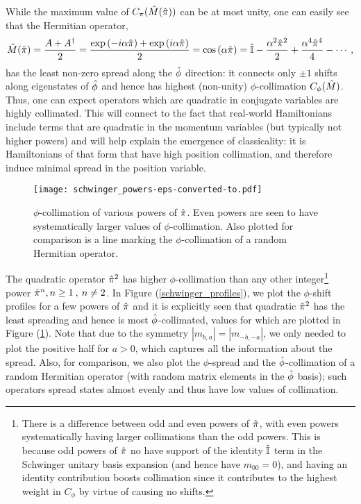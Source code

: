\documentclass[aps,pra,onecolumn,nofootinbib,12pt,tightenlines]{revtex4-1}
\begin{document}
While the maximum value of $C_{\pi}(\hat{M}(\hat{\pi}))$ can be at most unity, one can easily see that the Hermitian operator,
\begin{equation}
\M(\oppi) = \frac{A + A^{\dag}}{2} = \frac{\exp{\left(- i \alpha \oppi\right)} + \exp{\left(i \alpha \oppi\right)}}{2} = \cos\left( \alpha \oppi \right) = \eye - \frac{\alpha^{2} \oppi^{2}}{2} + \frac{\alpha^{4} \oppi^{4}}{4} - \cdots \: ,
\end{equation}
has the least non-zero spread along the $\hat{\phi}$ direction: it connects only $\pm 1$ shifts along eigenstates of $\hat{\phi}$ and hence has highest (non-unity) $\phi$-collimation $C_{\phi}(\hat{M})$. 
Thus, one can expect operators which are quadratic in conjugate variables are highly collimated. This will connect to the fact that real-world Hamiltonians include terms that are quadratic in the momentum variables (but typically not higher powers) and will help explain the emergence of classicality: it is Hamiltonians of that form that have high position collimation, and therefore induce minimal spread in the position variable. 
\begin{figure}[h]
\texttt{[image: schwinger\_powers-eps-converted-to.pdf]}
\caption{$\phi$-collimation of various powers of $\hat{\pi}$. Even powers are seen to have systematically larger values of $\phi$-collimation. Also plotted for comparison is a line marking the $\phi$-collimation of a random Hermitian operator.}
\label{schwinger_powers}
\end{figure}

The quadratic operator $\hat{\pi}^{2}$ has higher $\phi$-collimation than any other integer\footnote{There is a difference between odd and even powers of $\hat{\pi}$, with even powers systematically having larger collimations than the odd powers. This is because odd powers of $\hat{\pi}$ no have support of the identity $\hat{\mathbb{I}}$ term in the Schwinger unitary basis expansion (and hence have $m_{00} = 0$), and having an identity contribution boosts collimation since it contributes to the highest weight in $C_{\phi}$ by virtue of causing no shifts.} power $\hat{\pi}^{n}, n \geq 1 \: , \: n \neq 2$. In Figure (\ref{schwinger_profiles}), we plot the $\phi$-shift profiles for a few powers of $\hat{\pi}$ and it is explicitly seen that quadratic $\hat{\pi}^{2}$ has the least spreading and hence is most $\hat{\phi}$-collimated, values for which are plotted in Figure (\ref{schwinger_powers}). Note that due to the symmetry $|m_{b,a}| = |m_{-b,-a}|$, we only needed to plot the positive half for $a > 0$, which captures all the information about the spread. Also, for comparison, we also plot the $\phi$-spread and the $\hat{\phi}$-collimation of a {random} Hermitian operator (with random matrix elements in the $\hat{\phi}$ basis); such operators spread states almost evenly and thus have low values of collimation. 
\end{document}
